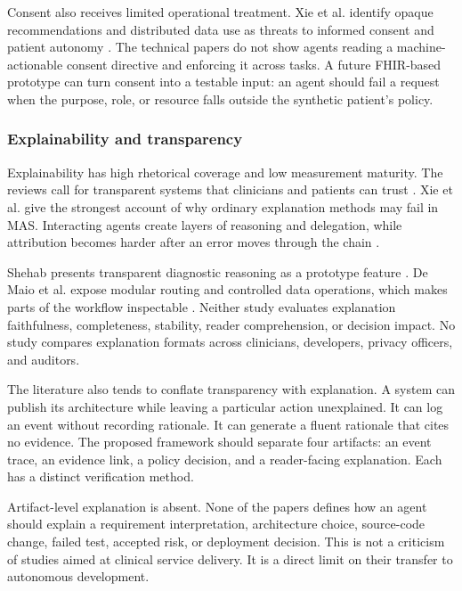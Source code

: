 \documentclass[11pt,a4paper]{article}
\begin{document}
Consent also receives limited operational treatment. Xie et al. identify opaque recommendations and distributed data use as threats to informed consent and patient autonomy \cite[pp.~8--10]{xie2026ethical}. The technical papers do not show agents reading a machine-actionable consent directive and enforcing it across tasks. A future FHIR-based prototype can turn consent into a testable input: an agent should fail a request when the purpose, role, or resource falls outside the synthetic patient's policy.

\subsubsection{Explainability and transparency}

Explainability has high rhetorical coverage and low measurement maturity. The reviews call for transparent systems that clinicians and patients can trust \cite{ode2025evidence,saeed2025applications,boye2025decision}. Xie et al. give the strongest account of why ordinary explanation methods may fail in MAS. Interacting agents create layers of reasoning and delegation, while attribution becomes harder after an error moves through the chain \cite[pp.~5--8]{xie2026ethical}.

Shehab presents transparent diagnostic reasoning as a prototype feature \cite[pp.~1--4]{shehab2025agentic}. De Maio et al. expose modular routing and controlled data operations, which makes parts of the workflow inspectable \cite[pp.~3--7]{demaio2025privacy}. Neither study evaluates explanation faithfulness, completeness, stability, reader comprehension, or decision impact. No study compares explanation formats across clinicians, developers, privacy officers, and auditors.

The literature also tends to conflate transparency with explanation. A system can publish its architecture while leaving a particular action unexplained. It can log an event without recording rationale. It can generate a fluent rationale that cites no evidence. The proposed framework should separate four artifacts: an event trace, an evidence link, a policy decision, and a reader-facing explanation. Each has a distinct verification method.

Artifact-level explanation is absent. None of the papers defines how an agent should explain a requirement interpretation, architecture choice, source-code change, failed test, accepted risk, or deployment decision. This is not a criticism of studies aimed at clinical service delivery. It is a direct limit on their transfer to autonomous development.
\end{document}
